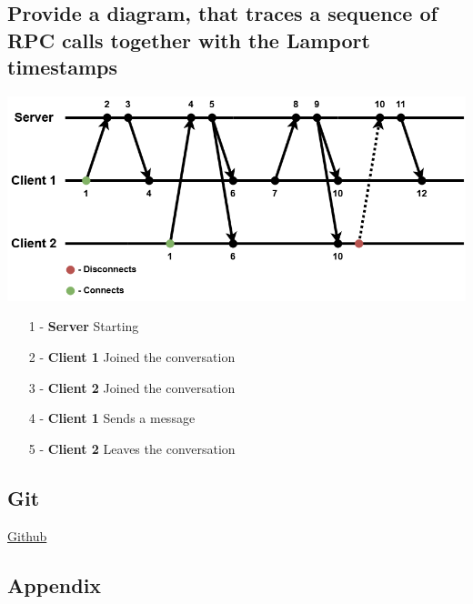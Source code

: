 \documentclass[a4paper,11pt]{article}
\begin{document}
\subsection*{Provide a diagram, that traces a sequence of RPC calls together with the Lamport timestamps}
\includegraphics[width=\textwidth]{chat.png}
\begin{center}
\begin{varwidth}{\textwidth}
\begin{enumerate}
    \setlength{\itemsep}{1pt}
    \setlength{\parskip}{0pt}
    \item[1 - \textbf{Server \;}] Starting
    \item[2 - \textbf{Client 1}] Joined the conversation
    \item[3 - \textbf{Client 2}] Joined the conversation
    \item[4 - \textbf{Client 1}] Sends a message
    \item[5 - \textbf{Client 2}] Leaves the conversation
\end{enumerate}
\end{varwidth}
\end{center}
\newpage
\subsection*{Git}
\href{https://github.com/ITU-DISYS2024-CENTRALIZEDSYSTEMS/Chitty-Chat}{Github}

\subsection*{Appendix}
\end{document}
